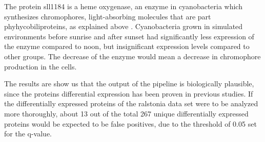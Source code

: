 The protein sll1184 is a heme oxygenase, an enzyme in cyanobacteria which synthesizes chromophores, light-absorbing molecules that are part phyhycobiliproteins, as explained above \cite{heme-oxygenase} \cite{heme-oxygenase-2}. Cyanobacteria grown in simulated environments before sunrise and after sunset had significantly less expression of the enzyme compared to noon, but insignificant expression levels compared to other groups. The decrease of the enzyme would mean a decrease in chromophore production in the cells.

The results are show us that the output of the pipeline is biologically plausible, since the proteins differential expression has been proven in previous studies. If the differentially expressed proteins of the ralstonia data set were to be analyzed more thoroughly, about 13 out of the total 267 unique  differentially expressed proteins would be expected to be false positives, due to the threshold of 0.05 set for the q-value.
